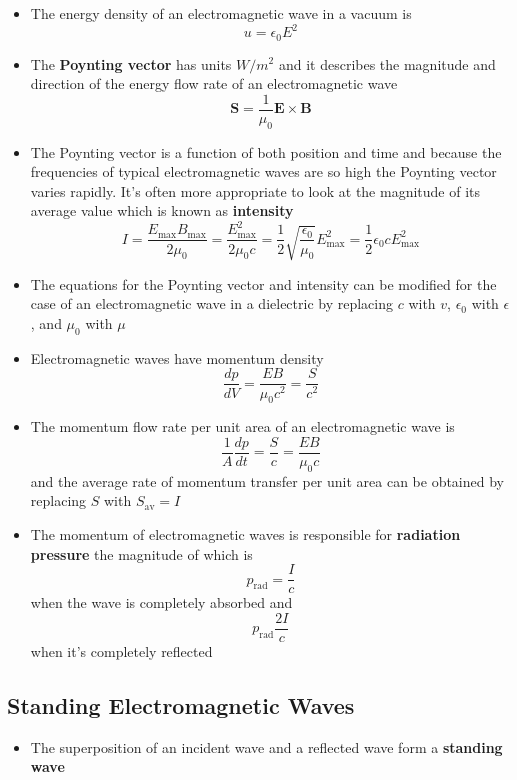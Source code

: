 \documentclass{article}
\begin{document}
\begin{itemize}
  \item The energy density of an electromagnetic wave in a vacuum is \[u = \epsilon_0 E^2\]

  \item The \textbf{Poynting vector} has units $\unit{W/m^2}$ and it describes the magnitude and direction of the energy flow rate of an electromagnetic wave \[\mathbf{S} = \frac{1}{\mu_0} \mathbf{E} \times \mathbf{B}\]

  \item The Poynting vector is a function of both position and time and because the frequencies of typical electromagnetic waves are so high the Poynting vector varies rapidly. It's often more appropriate to look at the magnitude of its average value which is known as \textbf{intensity} \[I = \frac{E_\text{max} B_\text{max}}{2 \mu_0} = \frac{E_\text{max}^2}{2 \mu_0 c} = \frac{1}{2} \sqrt{\frac{\epsilon_0}{\mu_0}} E_\text{max}^2 = \frac{1}{2} \epsilon_0 c E_\text{max}^2\]

  \item The equations for the Poynting vector and intensity can be modified for the case of an electromagnetic wave in a dielectric by replacing $c$ with $v$, $\epsilon_0$ with $\epsilon$, and $\mu_0$ with $\mu$

  \item Electromagnetic waves have momentum density \[\frac{dp}{dV} = \frac{E B}{\mu_0 c^2} = \frac{S}{c^2}\]

  \item The momentum flow rate per unit area of an electromagnetic wave is \[\frac{1}{A} \frac{dp}{dt} = \frac{S}{c} = \frac{E B}{\mu_0 c}\] and the average rate of momentum transfer per unit area can be obtained by replacing $S$ with $S_\text{av} = I$

  \item The momentum of electromagnetic waves is responsible for \textbf{radiation pressure} the magnitude of which is \[p_\text{rad} = \frac{I}{c}\] when the wave is completely absorbed and \[p_\text{rad} \frac{2 I}{c}\] when it's completely reflected
\end{itemize}

\subsection{Standing Electromagnetic Waves}

\begin{itemize}
  \item The superposition of an incident wave and a reflected wave form a \textbf{standing wave}
\end{itemize}
\end{document}
